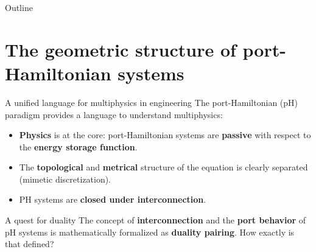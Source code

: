\documentclass[aspectratio=169]{beamer}
\begin{document}
	
	
	\begin{frame}[plain]
		
		
		
	\end{frame}
	
	
	\begin{frame}{Outline}
		
		\tableofcontents
		
	\end{frame}


\section{The geometric structure of port-Hamiltonian systems}

\begin{frame}{A unified language for multiphysics in engineering}
	The port-Hamiltonian (pH) paradigm provides a language to understand multiphysics:
	\vspace{.3cm}

			\begin{itemize}
				\item \textbf{Physics} is at the core: port-Hamiltonian systems are \textbf{passive} with respect to the \textbf{energy storage function}.
				\item The \textbf{topological} and \textbf{metrical} structure of the equation is clearly separated (mimetic discretization).
				\item PH systems are \textbf{closed under interconnection}. 
			\end{itemize}

	\begin{block}{A quest for duality}
		The concept of \textbf{interconnection} and the \textbf{port behavior} of pH systems is mathematically formalized as \textbf{duality pairing}. How exactly is that defined?
	\end{block}
	
	
\end{frame}
\end{document}
